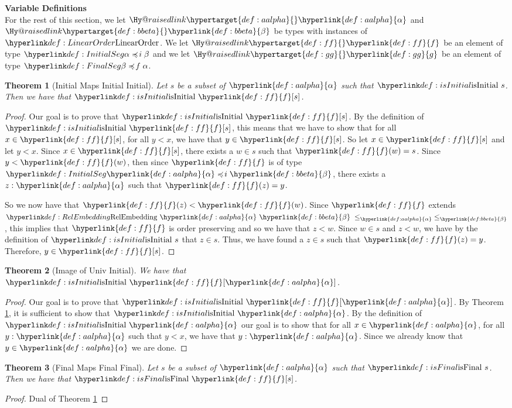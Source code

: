 \documentclass{article}
\makeatletter
\newcommand\newlink[2]{{\protect\hyperlink{#1}{\normalcolor #2}}}
\newcommand\newtarget[2]{\Hy@raisedlink{\hypertarget{#1}{}}#2}
\newtheorem{theorem}{Theorem}
\theoremstyle{definition}
\makeatother
\begin{document}
\newcommand\aalpha{\newlink{def:aalpha}{\alpha}}
\newcommand\bbeta{\newlink{def:bbeta}{\beta}}
\newcommand\tf{\newlink{def:ff}{f}}
\newcommand\tg{\newlink{def:gg}{g}}
\textbf{Variable Definitions}\\
For the rest of this section, we let $\newtarget{def:aalpha}{\aalpha}$ and $\newtarget{def:bbeta}{\bbeta}$ be types with instances of $\LinearOrder$.
We let $\newtarget{def:ff}{\tf}$ be an element of type $\InitialSeg{\alpha}{\beta}$ and we let $\newtarget{def:gg}{\tg}$ be an element of type $\FinalSeg{\beta}{\alpha}$.

\begin{theorem}[Initial Maps Initial Initial]
\label{initial_maps_initial_initial}
Let $s$ be a subset of $\aalpha$ such that $\isInitial{s}$. Then we have that $\isInitial{\tf[s]}$.
\end{theorem}
\begin{proof}
Our goal is to prove that $\isInitial{\tf[s]}$. By the definition of $\isInitial{\tf[s]}$, this means that we have to show that for all $x\in \tf[s]$, for all $y < x$, we have that $y\in \tf[s]$. So let $x\in \tf[s]$ and let $y < x$. Since $x\in \tf[s]$, there exists a $w\in s$ such that $\tf(w) = s$. Since $y < \tf(w)$, then since $\tf$ is of type $\InitialSeg{\aalpha}{\bbeta}$, there exists a $z : \aalpha$ such that $\tf(z) = y$.

So we now have that $\tf(z) < \tf(w)$. Since $\tf$ extends $\RelEmbedding{\aalpha}{\bbeta}{\le_\aalpha}{\le_\bbeta}$, this implies that $\tf$ is order preserving and so we have that $z < w$. Since $w\in s$ and $z < w$, we have by the definition of $\isInitial{s}$ that $z \in s$. Thus, we have found a $z\in s$ such that $\tf(z) = y$. Therefore, $y\in \tf[s]$.
\end{proof}

\begin{theorem}[Image of Univ Initial]
\label{image_of_univ_initial}
We have that $\isInitial{\tf[\aalpha]}$.
\end{theorem}
\begin{proof}
Our goal is to prove that $\isInitial{\tf[\aalpha]}$. By Theorem \ref{initial_maps_initial_initial}, it is sufficient to show that $\isInitial{\aalpha}$. By the definition of $\isInitial{\aalpha}$ our goal is to show that for all $x\in \aalpha$, for all $y : \aalpha $ such that $y < x$, we have that $y : \aalpha$. Since we already know that $y\in \aalpha$ we are done.
\end{proof}

\begin{theorem}[Final Maps Final Final]
\label{final_maps_final_final}
Let $s$ be a subset of $\aalpha$ such that $\isFinal{s}$. Then we have that $\isFinal{\tf[s]}$.
\end{theorem}
\begin{proof}
Dual of Theorem \ref{initial_maps_initial_initial}
\end{proof}
\end{document}
